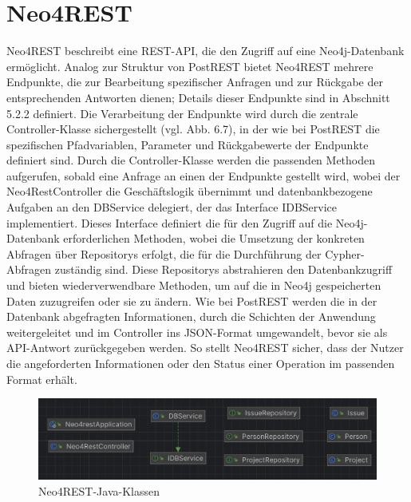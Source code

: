 \section{Neo4REST} %
\label{sec:neo4rest}
Neo4REST beschreibt eine REST-API, die den Zugriff auf eine Neo4j-Datenbank ermöglicht. Analog zur Struktur von PostREST bietet Neo4REST mehrere Endpunkte, die zur Bearbeitung spezifischer Anfragen und zur Rückgabe der entsprechenden Antworten dienen; Details dieser Endpunkte sind in Abschnitt 5.2.2 definiert. Die Verarbeitung der Endpunkte wird durch die zentrale Controller-Klasse sichergestellt (vgl. Abb. 6.7), in der wie bei PostREST die spezifischen Pfadvariablen, Parameter und Rückgabewerte der Endpunkte definiert sind. Durch die Controller-Klasse werden die passenden Methoden aufgerufen, sobald eine Anfrage an einen der Endpunkte gestellt wird, wobei der Neo4RestController die Geschäftslogik übernimmt und datenbankbezogene Aufgaben an den DBService delegiert, der das Interface IDBService implementiert. Dieses Interface definiert die für den Zugriff auf die Neo4j-Datenbank erforderlichen Methoden, wobei die Umsetzung der konkreten Abfragen über Repositorys erfolgt, die für die Durchführung der Cypher-Abfragen zuständig sind. Diese Repositorys abstrahieren den Datenbankzugriff und bieten wiederverwendbare Methoden, um auf die in Neo4j gespeicherten Daten zuzugreifen oder sie zu ändern. Wie bei PostREST werden die in der Datenbank abgefragten Informationen, durch die Schichten der Anwendung weitergeleitet und im Controller ins JSON-Format umgewandelt, bevor sie als API-Antwort zurückgegeben werden. So stellt Neo4REST sicher, dass der Nutzer die angeforderten Informationen oder den Status einer Operation im passenden Format erhält.
\begin{figure}[H]
	\centering
	\includegraphics[scale=0.5]{Illustrations/neo4rest.png}
	\caption{Neo4REST-Java-Klassen }
\end{figure}


